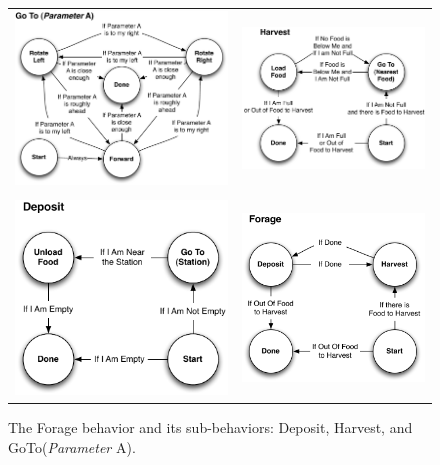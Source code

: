 \documentclass[11pt]{article}
\begin{document}
\begin{figure}
\begin{center}
\noindent\begin{tabular}{cc}
\includegraphics[width=3.5in]{GoTo.pdf}&
\includegraphics[width=3in]{Harvest.pdf}\\
\\
\includegraphics[width=2.6in]{Deposit.pdf}&
\includegraphics[width=2.6in]{Forage.pdf}\\
\end{tabular}
\end{center}
\caption{The Forage behavior and its sub-behaviors: Deposit, Harvest, and GoTo({\it Parameter} A).}
\label{foraging}
\end{figure}
\end{document}
